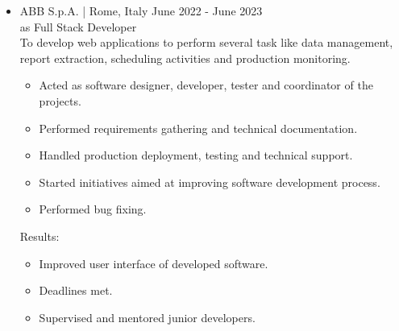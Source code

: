 \documentclass[english,10pt,a4paper]{article}
\newcommand{\Color}[1]{\textcolor{CvColor}{#1}}
\newcommand{\SubCompanyName}[1]{\textcolor{CvIcon}{{\footnotesize \textsf{#1}}}}
\newcommand{\JobTimeRange}[1]{{\scriptsize \textcolor{CvColor!50}{\faCalendar*} \hspace{0.01cm} \textcolor{CvIcon}{#1}}}
\newcommand{\CvCheck}{\textcolor{CvColor}{\faCheck}}
\begin{document}
\begin{paracol}{2}
\begin{tcolorbox}[colback=white, height=\textheight, colframe=white, left=0cm]
\begin{itemize}
{\begin{itemize}
					\textcolor{CvColor}{Results:}
					\begin{itemize}
						\item Improved user interface of developed software. 
						\item Deadlines met.
					\end{itemize}
					
					\textcolor{CvColor}{Acquired skills:}
					\begin{itemize}
						\item[\CvCheck] Significanlty improved knowledge about \Color{C\#}, \Color{\texttt{git}}, \Color{Azure DevOps} and \Color{Blazor}/\Color{MudBlazor}.
						\item[\CvCheck] Slightly improved my confidence in spoken English and my ability to teamwork.
						\item[\CvCheck] I acquired a little experience with \Color{Scrum} as agile project management. 
					\end{itemize}
					
					\vspace*{0.2cm}
					\item \SubCompanyName{ABB S.p.A.} \textcolor{CvColor}{|} {\scriptsize Rome, Italy} \hfill
					\JobTimeRange{June 2022 - June 2023}\\	
					{\scriptsize \textcolor{CvIcon}{as} \textcolor{CvColor}{Full Stack Developer}}\\		
					
					To develop web applications to perform several task like data management, report extraction, scheduling activities and production monitoring.
					\begin{itemize}
						\item Acted as software designer, developer, tester and coordinator of the projects.
						\item Performed requirements gathering and technical documentation.
						\item Handled production deployment, testing and technical support.
						\item Started initiatives aimed at improving software development process.
						\item Performed bug fixing.
					\end{itemize}
					
					\textcolor{CvColor}{Results:}
					\begin{itemize}
						\item Improved user interface of developed software. 
						\item Deadlines met.
						\item Supervised and mentored junior developers.
					\end{itemize}
					

\end{itemize}}
\end{itemize}
\end{tcolorbox}
\end{paracol}
\end{document}
